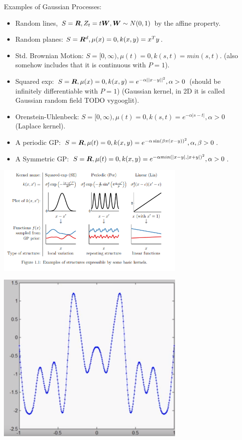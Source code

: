 Examples of Gaussian Processes:

\begin{itemize}
    \item Random lines, $S = {\bm{R}}, Z_t = t {\bm{W}}, {\bm{W}} \sim N(0, 1)$ by the affine property.
    \item Random planes: $S = {\bm{R}}^d, \mu(x) = 0, k(x,y) = x^T y$.
    \item Std. Brownian Motion: $S = [0, \infty), \mu(t) = 0, k(s, t) = min(s, t)$. (also somehow includes that it is continuous with $P = 1$).
    \item Squared exp: $S = {\bm{R}}, \mu(x) = 0, k(x,y) = e^{-\alpha ||x - y||^2}, \alpha > 0$ (should be infinitely differentiable with $P = 1$) (Gaussian kernel, in 2D it is called Gaussian random field {TODO vygooglit}).
    \item Orenstein-Uhlenbeck: $S = [0, \infty), \mu(t) = 0, k(s, t) = e^{-\alpha |s - t|}, \alpha > 0$ (Laplace kernel).
    \item A periodic GP: $S = {\bm{R}}, \mu(t) = 0, k(x, y) = e^{-\alpha \sin(\beta\pi(x - y))^2}, \alpha, \beta > 0$.
    \item A Symmetric GP: $S = {\bm{R}}, \mu(t) = 0, k(x, y) = e^{-\alpha min(|x-y|, |x+y|)^2}, \alpha>0$.
\end{itemize}

\includegraphics[width=0.7\textwidth]{img/kernels}

\includegraphics[width=0.7\textwidth]{img/symmetric-kernel}

